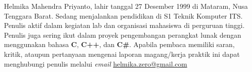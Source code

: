 \noindent Helmika Mahendra Priyanto, lahir tanggal 27 Desember 1999 di Mataram, Nusa Tenggara Barat.
Sedang menjalankan pendidikan di S1 Teknik Komputer ITS.
Penulis aktif dalam kegiatan lab dan organisasi mahasiswa di perguruan tinggi.
Penulis juga sering ikut dalam proyek pengembangan perangkat lunak dengan menggunakan bahasa \textbf{C}, \textbf{C++}, dan \textbf{C\#}.
Apabila pembaca memiliki saran, kritik, ataupun pertanyaan mengenai laporan magang/kerja praktik ini dapat menghubungi penulis melalui \textit{email} \href{mailto:helmika.zero@gmail.com}{helmika.zero@gmail.com}